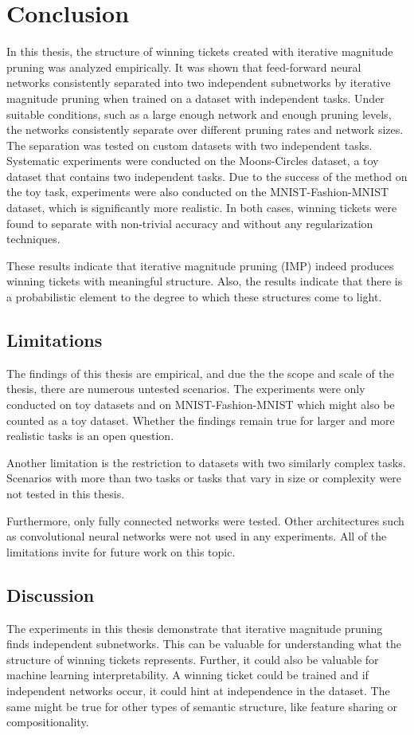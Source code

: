 \chapter{Conclusion}\label{chapter:conclusion} 

In this thesis, the structure of winning tickets created with iterative magnitude pruning was analyzed empirically.
It was shown that feed-forward neural networks consistently separated into two independent subnetworks by iterative magnitude pruning when trained on a dataset with independent tasks.
Under suitable conditions, such as a large enough network and enough pruning levels, the networks consistently separate over different pruning rates and network sizes.
The separation was tested on custom datasets with two independent tasks.
Systematic experiments were conducted on the Moons-Circles dataset, a toy dataset that contains two independent tasks.
Due to the success of the method on the toy task, experiments were also conducted on the MNIST-Fashion-MNIST dataset, which is significantly more realistic.
In both cases, winning tickets were found to separate with non-trivial accuracy and without any regularization techniques.

These results indicate that iterative magnitude pruning (IMP) indeed produces winning tickets with meaningful structure.
Also, the results indicate that there is a probabilistic element to the degree to which these structures come to light.

\section{Limitations}
The findings of this thesis are empirical, and due the the scope and scale of the thesis, there are numerous untested scenarios.
The experiments were only conducted on toy datasets and on MNIST-Fashion-MNIST which might also be counted as a toy dataset.
Whether the findings remain true for larger and more realistic tasks is an open question.

Another limitation is the restriction to datasets with two similarly complex tasks.
Scenarios with more than two tasks or tasks that vary in size or complexity were not tested in this thesis.

Furthermore, only fully connected networks were tested.
Other architectures such as convolutional neural networks were not used in any experiments.
All of the limitations invite for future work on this topic.

\section{Discussion}
The experiments in this thesis demonstrate that iterative magnitude pruning finds independent subnetworks.
This can be valuable for understanding what the structure of winning tickets represents.
Further, it could also be valuable for machine learning interpretability.
A winning ticket could be trained and if independent networks occur, it could hint at independence in the dataset.
The same might be true for other types of semantic structure, like feature sharing or compositionality.

